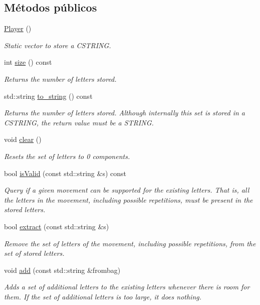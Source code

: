 \subsection*{Métodos públicos}
\begin{DoxyCompactItemize}
\item 
\hyperlink{classPlayer_affe0cc3cb714f6deb4e62f0c0d3f1fd8}{Player} ()
\begin{DoxyCompactList}\small\item\em Static vector to store a C\+S\+T\+R\+I\+NG. \end{DoxyCompactList}\item 
int \hyperlink{classPlayer_a706f8e7eb9f430881ce2c96e6f525b62}{size} () const
\begin{DoxyCompactList}\small\item\em Returns the number of letters stored. \end{DoxyCompactList}\item 
std\+::string \hyperlink{classPlayer_af069ef7e0afaead3c21ac3af4d3c9c40}{to\+\_\+string} () const
\begin{DoxyCompactList}\small\item\em Returns the number of letters stored. Although internally this set is stored in a C\+S\+T\+R\+I\+NG, the return value must be a S\+T\+R\+I\+NG. \end{DoxyCompactList}\item 
\mbox{\label{classPlayer_af1dda5581f5f56c61bac0cf07a300bdd}} 
void \hyperlink{classPlayer_af1dda5581f5f56c61bac0cf07a300bdd}{clear} ()
\begin{DoxyCompactList}\small\item\em Resets the set of letters to 0 components. \end{DoxyCompactList}\item 
bool \hyperlink{classPlayer_a342bbecdd43998f4ab968a895e371502}{is\+Valid} (const std\+::string \&s) const
\begin{DoxyCompactList}\small\item\em Query if a given movement can be supported for the existing letters. That is, all the letters in the movement, including possible repetitions, must be present in the stored letters. \end{DoxyCompactList}\item 
bool \hyperlink{classPlayer_a4fccb524224366a9fc30ff16042686c1}{extract} (const std\+::string \&s)
\begin{DoxyCompactList}\small\item\em Remove the set of letters of the movement, including possible repetitions, from the set of stored letters. \end{DoxyCompactList}\item 
void \hyperlink{classPlayer_a27777d29645eaef87edb912216dcf439}{add} (const std\+::string \&frombag)
\begin{DoxyCompactList}\small\item\em Adds a set of additional letters to the existing letters whenever there is room for them. If the set of additional letters is too large, it does nothing. \end{DoxyCompactList}\end{DoxyCompactItemize}


